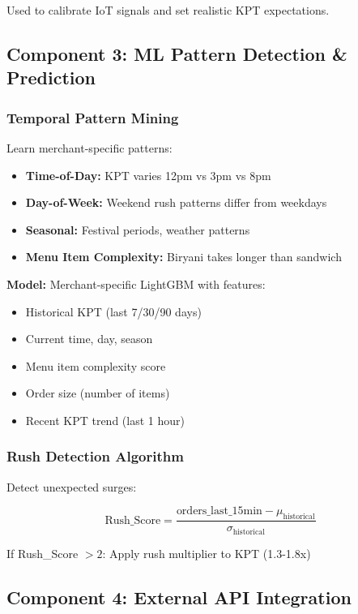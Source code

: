 \documentclass[11pt,a4paper]{article}
\begin{document}
Used to calibrate IoT signals and set realistic KPT expectations.

\subsection{Component 3: ML Pattern Detection \& Prediction}

\subsubsection{Temporal Pattern Mining}

Learn merchant-specific patterns:

\begin{itemize}[leftmargin=*]
    \item \textbf{Time-of-Day:} KPT varies 12pm vs 3pm vs 8pm
    \item \textbf{Day-of-Week:} Weekend rush patterns differ from weekdays
    \item \textbf{Seasonal:} Festival periods, weather patterns
    \item \textbf{Menu Item Complexity:} Biryani takes longer than sandwich
\end{itemize}

\textbf{Model:} Merchant-specific LightGBM with features:
\begin{itemize}
    \item Historical KPT (last 7/30/90 days)
    \item Current time, day, season
    \item Menu item complexity score
    \item Order size (number of items)
    \item Recent KPT trend (last 1 hour)
\end{itemize}

\subsubsection{Rush Detection Algorithm}

Detect unexpected surges:

$$\text{Rush\_Score} = \frac{\text{orders\_last\_15min} - \mu_{\text{historical}}}{\sigma_{\text{historical}}}$$

If Rush\_Score $> 2$: Apply rush multiplier to KPT (1.3-1.8x)

\subsection{Component 4: External API Integration}
\end{document}
